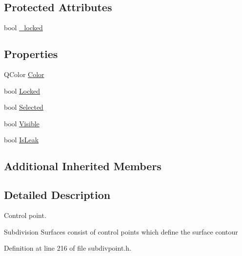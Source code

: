\subsection*{Protected Attributes}
\begin{DoxyCompactItemize}
\item 
bool \hyperlink{classShipCADGeometry_1_1SubdivisionControlPoint_a65710e5c15163d01dcfdb562abb23103}{\-\_\-locked}
\end{DoxyCompactItemize}
\subsection*{Properties}
\begin{DoxyCompactItemize}
\item 
Q\-Color \hyperlink{classShipCADGeometry_1_1SubdivisionControlPoint_aecfab9d47ea8e16714ce095e3e055e55}{Color}
\item 
bool \hyperlink{classShipCADGeometry_1_1SubdivisionControlPoint_a1e192709a33919e76207ebce39c4c916}{Locked}
\item 
bool \hyperlink{classShipCADGeometry_1_1SubdivisionControlPoint_a8ae4af44e0ff44086685a9b3a362dd43}{Selected}
\item 
bool \hyperlink{classShipCADGeometry_1_1SubdivisionControlPoint_a1170db5bc9091fb18f6dfb3fd61d4413}{Visible}
\item 
bool \hyperlink{classShipCADGeometry_1_1SubdivisionControlPoint_a722a0531b6f27404b82850de2305dbea}{Is\-Leak}
\end{DoxyCompactItemize}
\subsection*{Additional Inherited Members}


\subsection{Detailed Description}
Control point. 

Subdivision Surfaces consist of control points which define the surface contour 

Definition at line 216 of file subdivpoint.\-h.



